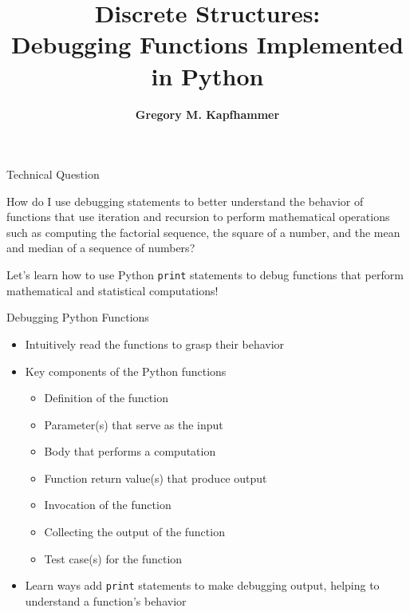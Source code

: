 \documentclass[14pt,aspectratio=169]{beamer}
\title{Discrete Structures: \\ Debugging Functions Implemented in Python}
\author{{\bf Gregory M. Kapfhammer}}
\institute[shortinst]{{\bf Department of Computer Science, Allegheny College}}
\begin{document}
{
  \begin{frame}
    \titlepage
  \end{frame}
}

%
\begin{frame}{Technical Question}
  \begin{center}
    {\large How do I use debugging statements to better understand the behavior
    of functions that use iteration and recursion to perform mathematical
  operations such as computing the factorial sequence, the square of a number,
and the mean and median of a sequence of numbers?}
  \end{center}
  \vspace{1ex}
  \begin{center}
    \small Let's learn how to use Python {\tt print} statements to debug
    functions that perform mathematical and statistical computations!
  \end{center}
\end{frame}

%
\begin{frame}{Debugging Python Functions}
  \begin{itemize}
    \item Intuitively read the functions to grasp their behavior
      \vspace*{-.15in}
    \item Key components of the Python functions
      \begin{itemize}
        \item Definition of the function
        \item Parameter(s) that serve as the input
        \item Body that performs a computation
        \item Function return value(s) that produce output
        \item Invocation of the function
        \item Collecting the output of the function
        \item Test case(s) for the function
      \end{itemize}
      \vspace*{-.2in}
    \item Learn ways add {\tt print} statements to make debugging output,
      helping to understand a function's behavior
  \end{itemize}
\end{frame}
\end{document}

